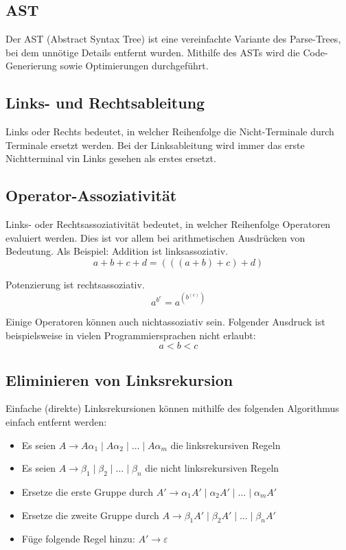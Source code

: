 \subsection{AST}

Der AST (Abstract Syntax Tree) ist eine vereinfachte Variante des Parse-Trees,
bei dem unnötige Details entfernt wurden. Mithilfe des ASTs wird die
Code-Generierung sowie Optimierungen durchgeführt.


\subsection{Links- und Rechtsableitung}

Links oder Rechts bedeutet, in welcher Reihenfolge die Nicht-Terminale durch
Terminale ersetzt werden. Bei der Linksableitung wird immer das erste
Nichtterminal vin Links gesehen als erstes ersetzt.


\subsection{Operator-Assoziativität}

Links- oder Rechtsassoziativität bedeutet, in welcher Reihenfolge Operatoren
evaluiert werden.  Dies ist vor allem bei arithmetischen Ausdrücken von
Bedeutung. Als Beispiel: Addition ist linksassoziativ.
\[
	a + b + c + d = (((a + b) + c) + d)
\]

Potenzierung ist rechtsassoziativ.
\[
	a^{b^c} = a^{(b^{(c)})}
\]

Einige Operatoren können auch nichtassoziativ sein. Folgender Ausdruck ist
beispielsweise in vielen Programmiersprachen nicht erlaubt:
\[
	a < b < c
\]


\subsection{Eliminieren von Linksrekursion}

Einfache (direkte) Linksrekursionen können mithilfe des folgenden Algorithmus einfach entfernt
werden:

\begin{itemize}
	\item Es seien $A \rightarrow A\alpha_1 \mid A\alpha_2 \mid \ldots \mid A\alpha_m$ die
		linksrekursiven Regeln
	\item Es seien $A \rightarrow \beta_1 \mid \beta_2 \mid \ldots \mid \beta_n$ die nicht
		linksrekursiven Regeln
	\item Ersetze die erste Gruppe durch $A' \rightarrow \alpha_1A'\mid \alpha_2A' \mid \ldots \mid
		\alpha_mA'$
	\item Ersetze die zweite Gruppe durch $A \rightarrow \beta_1A' \mid \beta_2A' \mid \ldots \mid
		\beta_nA'$
	\item Füge folgende Regel hinzu: $A' \rightarrow \varepsilon$
\end{itemize}

